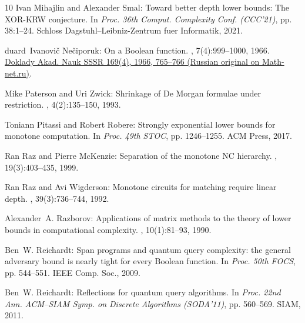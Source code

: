 \begin{thebibliography}{10}
{\sc Ivan Mihajlin and Alexander Smal}: Toward better depth lower bounds: The
  {XOR-KRW} conjecture.
\newblock In {\em Proc. 36th Comput. Complexity Conf. (CCC'21)}, pp. 38:1--24.
  Schloss Dagstuhl--Leibniz-Zentrum fuer Informatik, 2021.

{duard~Ivanovi{\v c} Ne{\v c}iporuk}: On a {B}oolean function.
, 7(4):999--1000, 1966.
\newblock \href{http://mi.mathnet.ru/dan32449}{Doklady Akad. Nauk SSSR 169(4),
  1966, 765--766 (Russian original on Math-net.ru)}.

{\sc Mike Paterson and Uri Zwick}: Shrinkage of {D}e {M}organ formulae under
  restriction.
, 4(2):135--150, 1993.

{\sc Toniann Pitassi and Robert Robere}: Strongly exponential lower bounds for
  monotone computation.
\newblock In {\em Proc. 49th STOC}, pp. 1246--1255. ACM Press, 2017.
\newblock [\epfmtdoi{10.1145/3055399.3055478}]

{\sc Ran Raz and Pierre McKenzie}: Separation of the monotone {NC} hierarchy.
, 19(3):403--435, 1999.
\newblock [\epfmtdoi{10.1007/s004930050062}]

{\sc Ran Raz and Avi Wigderson}: Monotone circuits for matching require linear
  depth.
, 39(3):736--744, 1992.
\newblock [\epfmtdoi{10.1145/146637.146684}]

{\sc Alexander~A. Razborov}: Applications of matrix methods to the theory of
  lower bounds in computational complexity.
, 10(1):81--93, 1990.
\newblock [\epfmtdoi{10.1007/BF02122698}]

{\sc Ben~W. Reichardt}: Span programs and quantum query complexity: the general
  adversary bound is nearly tight for every {B}oolean function.
\newblock In {\em Proc. 50th FOCS}, pp. 544--551. IEEE Comp. Soc., 2009.

{\sc Ben~W. Reichardt}: Reflections for quantum query algorithms.
\newblock In {\em Proc. 22nd Ann. ACM--SIAM Symp. on Discrete Algorithms
  (SODA'11)}, pp. 560--569. SIAM, 2011.
\newblock [\epfmtdoi{10.1137/1.9781611973082.44}]


\end{thebibliography}

